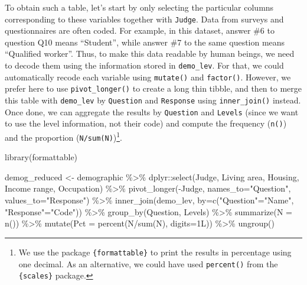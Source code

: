 \documentclass[
]{book}
\newenvironment{Shaded}{\begin{snugshade}}{\end{snugshade}}
\newcommand{\AttributeTok}[1]{\textcolor[rgb]{0.77,0.63,0.00}{#1}}
\newcommand{\FunctionTok}[1]{\textcolor[rgb]{0.00,0.00,0.00}{#1}}
\newcommand{\NormalTok}[1]{#1}
\newcommand{\OtherTok}[1]{\textcolor[rgb]{0.56,0.35,0.01}{#1}}
\newcommand{\SpecialCharTok}[1]{\textcolor[rgb]{0.00,0.00,0.00}{#1}}
\newcommand{\StringTok}[1]{\textcolor[rgb]{0.31,0.60,0.02}{#1}}
\begin{document}
To obtain such a table, let's start by only selecting the particular columns corresponding to these variables together with \texttt{Judge}.
Data from surveys and questionnaires are often coded. For example, in this dataset, answer \#6 to question Q10 means ``Student'', while answer \#7 to the same question means ``Qualified worker''. Thus, to make this data readable by human beings, we need to decode them using the information stored in \texttt{demo\_lev}. For that, we could automatically recode each variable using \texttt{mutate()} and \texttt{factor()}. However, we prefer here to use \texttt{pivot\_longer()} to create a long thin tibble, and then to merge this table with \texttt{demo\_lev} by \texttt{Question} and \texttt{Response} using \texttt{inner\_join()} instead. Once done, we can aggregate the results by \texttt{Question} and \texttt{Levels} (since we want to use the level information, not their code) and compute the frequency (\texttt{n()}) and the proportion (\texttt{N/sum(N)})\footnote{We use the package \texttt{\{formattable\}} to print the results in percentage using one decimal. As an alternative, we could have used \texttt{percent()} from the \texttt{\{scales\}} package.}.

\begin{Shaded}
\begin{Highlighting}[]
\FunctionTok{library}\NormalTok{(formattable)}

\NormalTok{demog\_reduced }\OtherTok{\textless{}{-}}\NormalTok{ demographic }\SpecialCharTok{\%\textgreater{}\%} 
\NormalTok{  dplyr}\SpecialCharTok{::}\FunctionTok{select}\NormalTok{(Judge, }\StringTok{\textasciigrave{}}\AttributeTok{Living area}\StringTok{\textasciigrave{}}\NormalTok{, Housing, }\StringTok{\textasciigrave{}}\AttributeTok{Income range}\StringTok{\textasciigrave{}}\NormalTok{, }\StringTok{\textasciigrave{}}\AttributeTok{Occupation}\StringTok{\textasciigrave{}}\NormalTok{) }\SpecialCharTok{\%\textgreater{}\%} 
  \FunctionTok{pivot\_longer}\NormalTok{(}\SpecialCharTok{{-}}\NormalTok{Judge, }\AttributeTok{names\_to=}\StringTok{"Question"}\NormalTok{, }\AttributeTok{values\_to=}\StringTok{"Response"}\NormalTok{) }\SpecialCharTok{\%\textgreater{}\%} 
  \FunctionTok{inner\_join}\NormalTok{(demo\_lev, }\AttributeTok{by=}\FunctionTok{c}\NormalTok{(}\StringTok{"Question"}\OtherTok{=}\StringTok{"Name"}\NormalTok{, }\StringTok{"Response"}\OtherTok{=}\StringTok{"Code"}\NormalTok{)) }\SpecialCharTok{\%\textgreater{}\%} 
  \FunctionTok{group\_by}\NormalTok{(Question, Levels) }\SpecialCharTok{\%\textgreater{}\%} 
  \FunctionTok{summarize}\NormalTok{(}\AttributeTok{N =} \FunctionTok{n}\NormalTok{()) }\SpecialCharTok{\%\textgreater{}\%} 
  \FunctionTok{mutate}\NormalTok{(}\AttributeTok{Pct =} \FunctionTok{percent}\NormalTok{(N}\SpecialCharTok{/}\FunctionTok{sum}\NormalTok{(N), }\AttributeTok{digits=}\NormalTok{1L)) }\SpecialCharTok{\%\textgreater{}\%} 
  \FunctionTok{ungroup}\NormalTok{()}
\end{Highlighting}
\end{Shaded}
\end{document}
